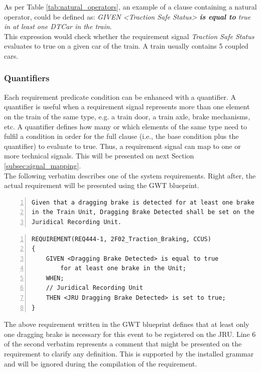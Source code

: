 As per Table \ref{tab:natural_operators}, an example of a clause containing a natural operator, could be defined as: \textit{GIVEN <Traction Safe Status> \textbf{is equal to} true in at least one DTCar in the train}.\\
This expression would check whether the requirement signal \textit{Traction Safe Status} evaluates to true on a given car of the train. A train usually contains 5 coupled cars.

\subsubsection{Quantifiers}
\label{subsubsec:quantifiers}

Each requirement predicate condition can be enhanced with a quantifier. A quantifier is useful when a requirement signal represents more than one element on the train of the same type, e.g. a train door, a train axle, brake mechanisms, etc. A quantifier defines how many or which elements of the same type need to fulfil a condition in order for the full clause (i.e., the base condition plus the quantifier) to evaluate to true.
Thus, a requirement signal can map to one or more technical signals. This will be presented on next Section \ref{subsec:signal_mapping}.\\

The following verbatim describes one of the system requirements. Right after, the actual requirement will be presented using the GWT blueprint.\\

\begin{Verbatim}[xleftmargin=12mm,numbers=left]
Given that a dragging brake is detected for at least one brake 
in the Train Unit, Dragging Brake Detected shall be set on the
Juridical Recording Unit.
\end{Verbatim}


\begin{Verbatim}[xleftmargin=12mm, numbers=left]
REQUIREMENT(REQ444-1, 2F02_Traction_Braking, CCUS)
{
	GIVEN <Dragging Brake Detected> is equal to true 
	    for at least one brake in the Unit;
	WHEN;
	// Juridical Recording Unit
	THEN <JRU Dragging Brake Detected> is set to true;
}
\end{Verbatim}

The above requirement written in the GWT blueprint defines that at least only one dragging brake is necessary for this event to be registered on the JRU. Line 6 of the second verbatim represents a comment that might be presented on the requirement to clarify any definition. This is supported by the installed grammar and will be ignored during the compilation of the requirement.\\

